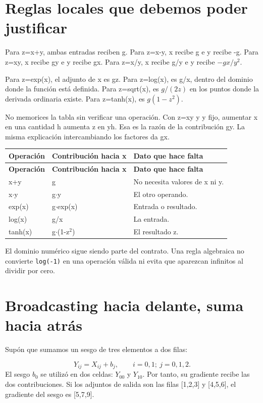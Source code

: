 \documentclass[12pt,a4paper,oneside]{report}
\begin{document}
\section{Reglas locales que debemos poder justificar}
Para z=x+y, ambas entradas reciben g. Para z=x-y, x recibe g e y recibe -g. Para z=xy, x recibe gy e y recibe gx. Para z=x/y, x recibe g/y e y recibe $-gx/y^2$.

Para z=exp(x), el adjunto de x es gz. Para z=log(x), es g/x, dentro del dominio donde la función está definida. Para z=sqrt(x), es $g/(2z)$ en los puntos donde la derivada ordinaria existe. Para z=tanh(x), es $g(1-z^2)$.

No memorices la tabla sin verificar una operación. Con z=xy y y fijo, aumentar x en una cantidad h aumenta z en yh. Esa es la razón de la contribución gy. La misma explicación intercambiando los factores da gx.

{\small
\begin{longtable}{@{}P{0.28\textwidth}P{0.32\textwidth}P{0.34\textwidth}@{}}
\toprule
\textbf{Operación} & \textbf{Contribución hacia x} & \textbf{Dato que hace falta}\\
\midrule
\endfirsthead
\toprule
\textbf{Operación} & \textbf{Contribución hacia x} & \textbf{Dato que hace falta}\\
\midrule
\endhead
x+y & g & No necesita valores de x ni y.\\
x\ensuremath{\cdot}y & g\ensuremath{\cdot}y & El otro operando.\\
exp(x) & g\ensuremath{\cdot}exp(x) & Entrada o resultado.\\
log(x) & g/x & La entrada.\\
tanh(x) & g\ensuremath{\cdot}(1-z\ensuremath{^2}) & El resultado z.\\
\bottomrule
\end{longtable}
}
El dominio numérico sigue siendo parte del contrato. Una regla algebraica no convierte \texttt{log(-1)} en una operación válida ni evita que aparezcan infinitos al dividir por cero.

\section{Broadcasting hacia delante, suma hacia atrás}
Supón que sumamos un sesgo de tres elementos a dos filas:

\[
Y_{ij}=X_{ij}+b_j,\qquad i=0,1;\ j=0,1,2.
\]
El sesgo $b_0$ se utilizó en dos celdas: $Y_{00}$ y $Y_{10}$. Por tanto, su gradiente recibe las dos contribuciones. Si los adjuntos de salida son las filas [1,2,3] y [4,5,6], el gradiente del sesgo es [5,7,9].
\end{document}
